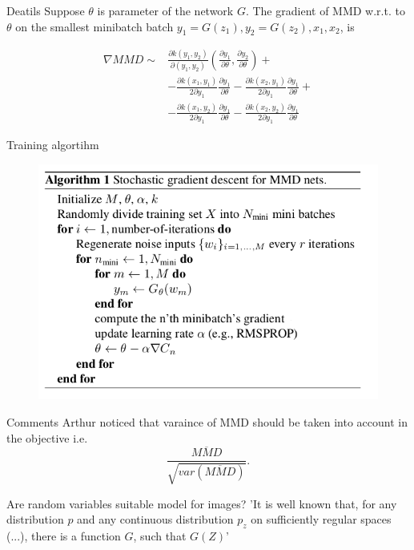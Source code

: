 \documentclass{beamer}
\begin{document}
\begin{frame}{Deatils}
Suppose  $\theta$ is parameter  of the network $G$. The gradient of MMD  w.r.t. to $\theta$ on the  smallest minibatch batch 
$y_1 = G(z_1), y_2 = G(z_2),x_1,x_2$, is

\begin{align*}
\nabla MMD \sim & \frac{ \partial k(y_1,y_2) } {\partial (y_1,y_2) } (\frac{\partial y_1}{\partial \theta } ,\frac{ \partial y_2} {\partial \theta }) + \\
   &-\frac{ \partial k(x_1,y_1) }{2\partial y_1} \frac{\partial y_1}{\partial \theta } -  \frac{ \partial k(x_2,y_1) }{2\partial y_1} \frac{\partial y_1}{\partial \theta }+ \\
   & -\frac{ \partial k(x_1,y_2) }{2\partial y_1} \frac{\partial y_1}{\partial \theta } - \frac{ \partial k(x_2,y_2) }{2\partial y_1} \frac{\partial y_1}{\partial \theta }
 \end{align*}


\end{frame}
 



\begin{frame}{Training algortihm}
\begin{figure}
 \includegraphics[width=\textwidth]{./img/alg1.png}
\end{figure}
\end{frame}  

\begin{frame}{Comments}
Arthur noticed that varaince of MMD should be taken into account in the objective i.e. 
\[
 \frac{ \overline{MMD}}{ \sqrt{ var(\overline{MMD})}}.
\]

Are random variables suitable model for images? 
'It is well known that, for any distribution $p$ and any continuous distribution $p_z$ on sufficiently regular spaces (...), there is a function $G$, such that $G(Z)$'
\end{frame}
\end{document}
